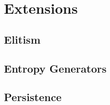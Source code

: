 \section{Extensions}
\todo

\subsection{Elitism}

\subsection{Entropy Generators}
\todo

\subsection{Persistence}
\todo

